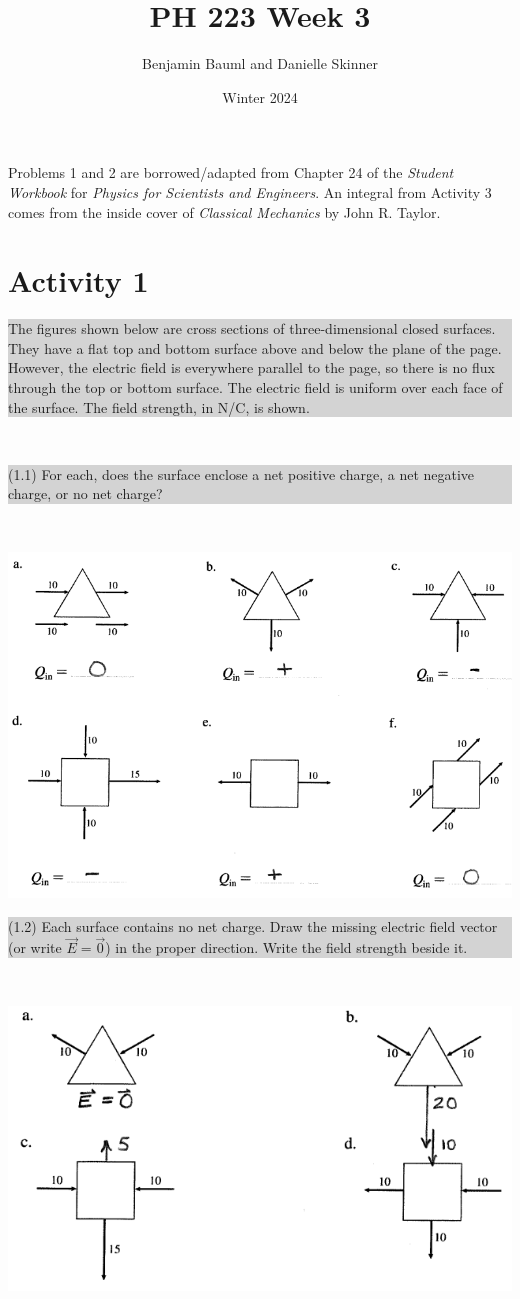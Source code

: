 \documentclass[]{article}
\title{PH 223 Week 3}
\author{Benjamin Bauml and Danielle Skinner}
\date{Winter 2024}
\newcommand{\excerpt}[1]{\colorbox{lightgray}{\parbox{14.8cm}{#1}} \\}
\begin{document}
\maketitle

\begin{center}
Problems 1 and 2 are borrowed/adapted from Chapter 24 of the \textit{Student Workbook} for \textit{Physics for Scientists and Engineers}. An integral from Activity 3 comes from the inside cover of \textit{Classical Mechanics} by John R. Taylor.
\end{center}
\section*{Activity 1}%
\excerpt{
The figures shown below are cross sections of three-dimensional closed surfaces. They have a flat top and bottom surface above and below the plane of the page. However, the electric field is everywhere parallel to the page, so there is no flux through the top or bottom surface. The electric field is uniform over each face of the surface. The field strength, in N/C, is shown.
}
\excerpt{
(1.1) For each, does the surface enclose a net positive charge, a net negative charge, or no net charge?
}
\begin{center}
	\includegraphics[scale=0.5]{A11Sol}%
\end{center}
\pagebreak
\excerpt{
(1.2) Each surface contains no net charge. Draw the missing electric field vector (or write $ \vec{E} = \vec{0} $) in the proper direction. Write the field strength beside it.
}
\begin{center}
	\includegraphics[scale=0.5]{A12Sol}%
\end{center}
\end{document}
